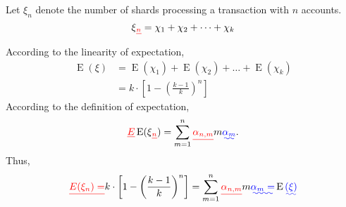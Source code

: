 \documentclass[10pt, conference, letterpaper]{IEEEtran}
\providecommand{\DIFadd}[1]{{\protect\color{blue}\uwave{#1}}} %
\providecommand{\DIFdel}[1]{{\protect\color{red}\sout{#1}}}                      %
\providecommand{\DIFaddbegin}{} %
\providecommand{\DIFaddend}{} %
\providecommand{\DIFdelbegin}{} %
\providecommand{\DIFdelend}{} %
\newcommand{\DIFscaledelfig}{0.5}
\newlength{\DIFdelgraphicswidth} %
\newlength{\DIFdelgraphicsheight} %
\newcommand{\DIFaddincludegraphics}[2][]{{\color{blue}\fbox{\DIFOincludegraphics[#1]{#2}}}} %
\newcommand{\DIFdelincludegraphics}[2][]{%
\sbox{\DIFdelgraphicsbox}{\DIFOincludegraphics[#1]{#2}}%
\settoboxwidth{\DIFdelgraphicswidth}{\DIFdelgraphicsbox} %
\settoboxtotalheight{\DIFdelgraphicsheight}{\DIFdelgraphicsbox} %
\scalebox{\DIFscaledelfig}{%
\parbox[b]{\DIFdelgraphicswidth}{\usebox{\DIFdelgraphicsbox}\\[-\baselineskip] \rule{\DIFdelgraphicswidth}{0em}}\llap{\resizebox{\DIFdelgraphicswidth}{\DIFdelgraphicsheight}{%
\setlength{\unitlength}{\DIFdelgraphicswidth}%
\begin{picture}(1,1)%
\thicklines\linethickness{2pt} %
{\color[rgb]{1,0,0}\put(0,0){\framebox(1,1){}}}%
{\color[rgb]{1,0,0}\put(0,0){\line( 1,1){1}}}%
{\color[rgb]{1,0,0}\put(0,1){\line(1,-1){1}}}%
\end{picture}%
}\hspace*{3pt}}} %
} %
\DeclareRobustCommand{\DIFaddbegin}{\DIFOaddbegin \let\includegraphics\DIFaddincludegraphics} %
\DeclareRobustCommand{\DIFaddend}{\DIFOaddend \let\includegraphics\DIFOincludegraphics} %
\DeclareRobustCommand{\DIFdelbegin}{\DIFOdelbegin \let\includegraphics\DIFdelincludegraphics} %
\DeclareRobustCommand{\DIFdelend}{\DIFOaddend \let\includegraphics\DIFOincludegraphics} %
\begin{document}
Let \DIFdelbegin \DIFdel{$\xi_n$ }\DIFdelend \DIFaddbegin \DIFadd{$\xi$ }\DIFaddend denote the number of shards processing  a transaction with $n$ accounts.		
\begin{equation}
	\xi\DIFdelbegin \DIFdel{_n}\DIFdelend = \chi_1+ \chi_2+\dots+ \chi_k
\end{equation}
According to the linearity of expectation,  
\begin{equation}
	\DIFdelbegin %
\DIFdelend \DIFaddbegin \begin{split}
		\operatorname{E}(\xi)&=\operatorname{E}( \chi_1)+\operatorname{E}( \chi_2)+\dots+\operatorname{E}( \chi_k)  \\
		&= k\cdot \left[1-\left(\frac{k-1}{k}\right)^n\right]
	\end{split}\DIFaddend 
\end{equation}
According to the definition of expectation,
\begin{equation}
	\DIFdelbegin \DIFdel{E}\DIFdelend \DIFaddbegin \operatorname{E}\DIFaddend (\xi\DIFdelbegin \DIFdel{_n}\DIFdelend )=\sum_{m=1}^n  \DIFdelbegin \DIFdel{\alpha_{n,m}}\DIFdelend m\DIFaddbegin \DIFadd{\alpha_{m}}\DIFaddend .
\end{equation}
Thus, 
\begin{equation}
	\DIFdelbegin \DIFdel{E(\xi_n)= }\DIFdelend k\cdot \left[1-\left(\frac{k-1}{k}\right)^n\right]=\sum_{m=1}^n  \DIFdelbegin \DIFdel{\alpha_{n,m}}\DIFdelend m\DIFaddbegin \DIFadd{\alpha_{m} = }\operatorname{E}\DIFadd{(\xi) }\DIFaddend \\
\end{equation}
\end{document}

